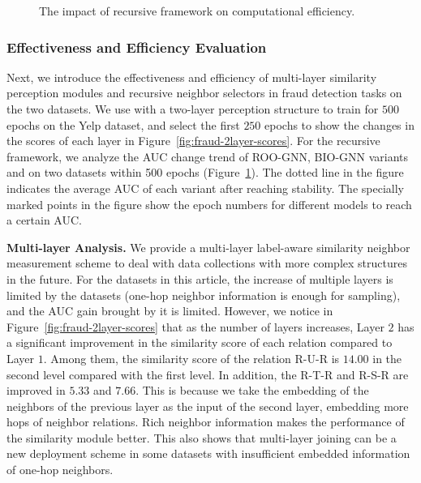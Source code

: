 \begin{figure}[t]
\centering
{}

\centering
\caption{The impact of recursive framework on computational efficiency.}\label{fig:fraud-efficiency}
\end{figure}


\subsubsection{Effectiveness and Efficiency Evaluation}\label{sec:fraud-efficiency}
Next, we introduce the effectiveness and efficiency of multi-layer similarity perception modules and recursive neighbor selectors in fraud detection tasks on the two datasets.
We use \RioGNN with a two-layer perception structure to train for $500$ epochs on the Yelp dataset, and select the first $250$ epochs to show the changes in the scores of each layer in Figure~\ref{fig:fraud-2layer-scores}.
For the recursive framework, we analyze the AUC change trend of ROO-GNN, BIO-GNN variants and \RioGNN on two datasets within 500 epochs (Figure~\ref{fig:fraud-efficiency}).
The dotted line in the figure indicates the average AUC of each variant after reaching stability.
The specially marked points in the figure show the epoch numbers for different models to reach a certain AUC.

\textbf{Multi-layer Analysis.}
We provide a multi-layer label-aware similarity neighbor measurement scheme to deal with data collections with more complex structures in the future. 
For the datasets in this article, the increase of multiple layers is limited by the datasets (one-hop neighbor information is enough for sampling), and the AUC gain brought by it is limited. 
However, we notice in Figure~\ref{fig:fraud-2layer-scores} that as the number of layers increases, Layer $2$ has a significant improvement in the similarity score of each relation compared to Layer $1$. 
Among them, the similarity score of the relation R-U-R is $14.00$ in the second level compared with the first level. 
In addition, the R-T-R and R-S-R are improved in $5.33$ and $7.66$.
This is because we take the embedding of the neighbors of the previous layer as the input of the second layer, embedding more hops of neighbor relations. 
Rich neighbor information makes the performance of the similarity module better. This also shows that multi-layer joining can be a new deployment scheme in some datasets with insufficient embedded information of one-hop neighbors.

